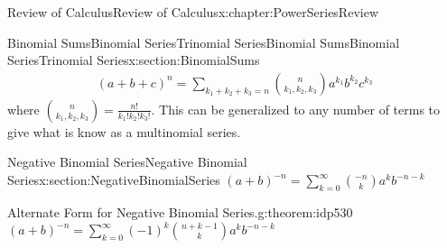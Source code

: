 \documentclass[oneside,10pt,]{book}
\numberwithin{equation}{section}
\begin{document}
\begin{chapterptx}{Review of Calculus}{}{Review of Calculus}{}{}{x:chapter:PowerSeriesReview}
\begin{sectionptx}{Binomial SumsBinomial SeriesTrinomial Series}{}{Binomial SumsBinomial SeriesTrinomial Series}{}{}{x:section:BinomialSums}
\begin{gather*}
(a+b+c)^n = \sum_{k_1+k_2+k_3=n}^{} {\binom{n}{k_1,k_2,k_3} a^{k_1} b^{k_2} c^{k_3}} 
\end{gather*}
where \(\binom{n}{k_1,k_2,k_3} = \frac{n!}{k_1!k_2!k_3!}\). This can be generalized to any number of terms to give what is know as a multinomial series.%
\end{sectionptx}
%
%
\typeout{************************************************}
\typeout{************************************************}
%
\begin{sectionptx}{Negative Binomial Series}{}{Negative Binomial Series}{}{}{x:section:NegativeBinomialSeries}
\((a+b)^{-n} = \sum_{k=0}^{\infty} {\binom{-n}{k} a^k b^{-n-k}}\)%
\begin{theorem}{Alternate Form for Negative Binomial Series.}{}{g:theorem:idp530}%
\((a+b)^{-n} = \sum_{k=0}^{\infty} {(-1)^k \binom{n+k-1}{k} a^k b^{-n-k}}\)%
\end{theorem}
\end{sectionptx}
\end{chapterptx}
\end{document}
